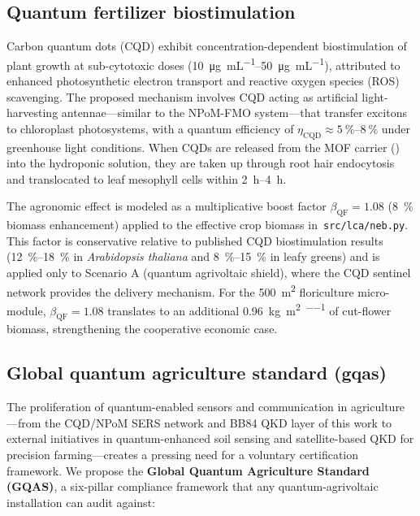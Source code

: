 \documentclass[11pt,a4paper]{article}
\begin{document}
\subsection{Quantum fertilizer biostimulation}
\label{SI-sec:quantum_fertiliser}

Carbon quantum dots (CQD) exhibit
concentration-dependent biostimulation of plant growth at sub-cytotoxic
doses (\qtyrange{10}{50}{\ug\per\mL}), attributed to enhanced
photosynthetic electron transport and reactive oxygen species (ROS)
scavenging. The proposed mechanism involves CQD acting as artificial
light-harvesting antennae---similar to the NPoM-FMO system---that
transfer excitons to chloroplast photosystems, with a quantum efficiency
of $\eta_{\mathrm{CQD}} \approx \qtyrange{5}{8}{\percent}$ under greenhouse light
conditions. When CQDs are released from the MOF carrier
() into the hydroponic solution, they are taken up
through root hair endocytosis and translocated to leaf mesophyll cells
within \qtyrange{2}{4}{\hour}.

The agronomic effect is modeled as a multiplicative boost factor
$\beta_{\mathrm{QF}} = 1.08$ (\qty{8}{\percent} biomass enhancement) applied to the
effective crop biomass in~\texttt{src/lca/neb.py}. This factor is
conservative relative to published CQD biostimulation results (\qtyrange{12}{18}{\percent}
in \textit{Arabidopsis thaliana} and \qtyrange{8}{15}{\percent} in leafy greens) and is
applied only to Scenario A (quantum agrivoltaic shield), where the CQD
sentinel network provides the delivery mechanism. For the
\qty{500}{\m\squared} floriculture micro-module,
$\beta_{\mathrm{QF}} = 1.08$ translates to an additional
\qty{0.96}{\kg\per\m\squared\per\yr} of cut-flower biomass,
strengthening the cooperative economic case.

\subsection{Global quantum agriculture standard (gqas)}
\label{SI-sec:gqas}

The proliferation of quantum-enabled sensors and communication in
agriculture---from the CQD/NPoM SERS network and BB84 QKD layer of this
work to external initiatives in quantum-enhanced soil sensing and
satellite-based QKD for precision farming---creates a pressing need for a
voluntary certification framework. We propose the \textbf{Global Quantum
Agriculture Standard (GQAS)}, a six-pillar compliance framework that any
quantum-agrivoltaic installation can audit against:
\end{document}
